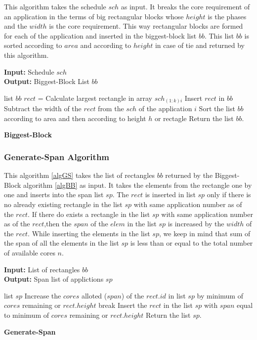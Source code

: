\documentclass[10pt, conference]{IEEEtran}
\begin{document}
This algorithm takes the schedule $sch$ as input. It breaks the core requirement of an application in the terms of big rectangular blocks whose $height$ is the phases and the $width$ is the core requirement. This way rectangular blocks are formed for each of the application and inserted in the biggest-block list $bb$. This list $bb$ is sorted according to $area$ and according to $height$ in case of tie and returned by this algorithm. 

\begin{algorithm}[tb]
\footnotesize
\textbf{Input:} Schedule $sch$ \ \\
\textbf{Output:} Biggest-Block List $bb$
\begin{algorithmic}[1]
\STATE list $bb$
		\STATE $rect$ = Calculate largest rectangle in array $sch_{(1:k)i}$
		\STATE Insert $rect$ in $bb$
			\STATE Subtract the width of the $rect$ from the $sch$ of the application $i$ 
		\ENDFOR	
	\ENDWHILE
\ENDFOR
\STATE Sort the list $bb$ according to area and then according to height $h$ or rectagle
\STATE Return the list $bb$.
\end{algorithmic}
\caption{\textbf{Biggest-Block}}
\vspace{-0.1cm}
\label{algBB}
\end{algorithm}

\subsubsection{Generate-Span Algorithm}
This algorithm \ref{algGS} takes the list of rectangles $bb$ returned by the Biggest-Block algorithm \ref{algBB} as input. It takes the elements from the rectangle one by one and inserts into the span list $sp$. The $rect$ is inserted in list $sp$ only if there is no already existing rectangle in the list $sp$ with same application number as of the $rect$. If there do exists a rectangle in the list $sp$ with same application number as of the $rect$,then the $span$ of the $elem$ in the list $sp$ is increased by the $width$ of the $rect$. While inserting the elements in the list $sp$, we keep in mind that sum of the span of all the elements in the list $sp$ is less than or equal to the total number of available cores $n$. 

\begin{algorithm}[tb]
\footnotesize
\textbf{Input:} List of rectangles $bb$\ \\
\textbf{Output:} Span list of applictions $sp$
\begin{algorithmic}[1]
\STATE list $sp$
			\STATE Increase the $cores$ alloted ($span$) of the $rect.id$ in list $sp$ by minimum of $cores$ remaining or $rect.height$
		\ELSE
			\STATE break
		\ENDIF
	\ELSE
		\STATE Insert the $rect$ in the list $sp$ with $span$ equal to minimum of $cores$ remaining or $rect.height$
	\ENDIF
\ENDFOR
\STATE Return the list $sp$.
\end{algorithmic}
\caption{\textbf{Generate-Span}}
\vspace{-0.1cm}
\label{algGS}
\end{algorithm}
\end{document}
